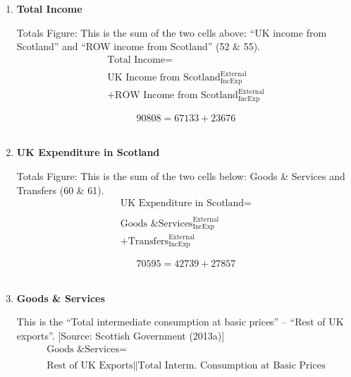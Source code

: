 \begin{enumerate}
\item \textbf {Total Income}

Totals Figure: This is the sum of the two cells above: “UK income from Scotland” and “ROW income from Scotland” (52 \& 55).\\

\begin{equation}
\begin{split}
\text{Total Income} =  \\ \\
\text{UK Income from Scotland}^\text{External}_\text{IncExp}\\
+\text{ROW Income from Scotland}^\text{External}_\text{IncExp}
\end{split} \label{eq:2.5.61}
\end{equation}

\begin{equation} \nonumber
90808 = 67133+23676
\end{equation}\\



\pagebreak

\item \textbf {UK Expenditure in Scotland}

Totals Figure: This is the sum of the two cells below: Goods \& Services and Transfers (60 \& 61).\\

\begin{equation}
\begin{split}
\text{UK Expenditure in Scotland} =  \\ \\
\text{Goods \& Services}^\text{External}_\text{IncExp}\\
+\text{Transfers}^\text{External}_\text{IncExp}
\end{split} \label{eq:2.5.62}
\end{equation}

\begin{equation} \nonumber
70595 = 42739+27857
\end{equation}\\


\item \textbf {Goods \& Services}

This is the “Total intermediate consumption at basic prices” – “Rest of UK exports”. [Source: Scottish Government (2013a)]\\

\begin{equation}
\begin{split}
\text{Goods \& Services} =  \\ \\
\text{Rest of UK Exports}\|\text{Total Interm. Consumption at Basic Prices}
\end{split} \label{eq:2.5.63}
\end{equation}


\end{enumerate}
